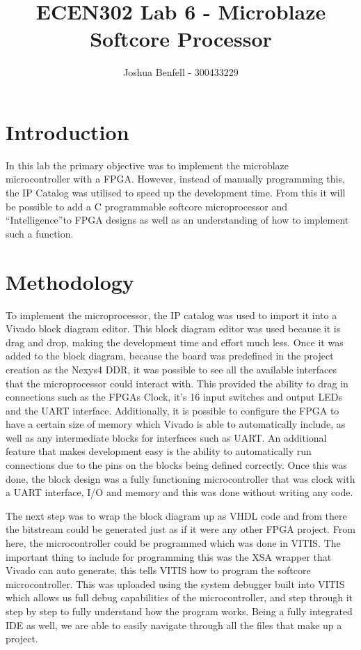 \documentclass[a4paper, 12pt]{article}
\title{ECEN302 Lab 6 - Microblaze Softcore Processor}
\author{Joshua Benfell - 300433229}
\begin{document}
	\maketitle
	
	\section{Introduction}
		In this lab the primary objective was to implement the microblaze microcontroller with a FPGA. However, instead of manually programming this, the IP Catalog was utilised to speed up the development time. From this it will be possible to add a C programmable softcore microprocessor and ``Intelligence''to FPGA designs as well as an understanding of how to implement such a function.
	\section{Methodology}
		To implement the microprocessor, the IP catalog was used to import it into a Vivado block diagram editor. This block diagram editor was used because it is drag and drop, making the development time and effort much less. Once it was added to the block diagram, because the board was predefined in the project creation as the Nexys4 DDR, it was possible to see all the available interfaces that the microprocessor could interact with. This provided the ability to drag in connections such as the FPGAs Clock, it's 16 input switches and output LEDs and the UART interface. Additionally, it is possible to configure the FPGA to have a certain size of memory which Vivado is able to automatically include, as well as any intermediate blocks for interfaces such as UART. An additional feature that makes development easy is the ability to automatically run connections due to the pins on the blocks being defined correctly. Once this was done, the block design was a fully functioning microcontroller that was clock with a UART interface, I/O and memory and this was done without writing any code. 
		\par
		The next step was to wrap the block diagram up as VHDL code and from there the bitstream could be generated just as if it were any other FPGA project. From here, the microcontroller could be programmed which was done in VITIS. The important thing to include for programming this was the XSA wrapper that Vivado can auto generate, this tells VITIS how to program the softcore microcontroller. This was uploaded using the system debugger built into VITIS which allows us full debug capabilities of the microcontroller, and step through it step by step to fully understand how the program works. Being a fully integrated IDE as well, we are able to easily navigate through all the files that make up a project. 



\end{document}
